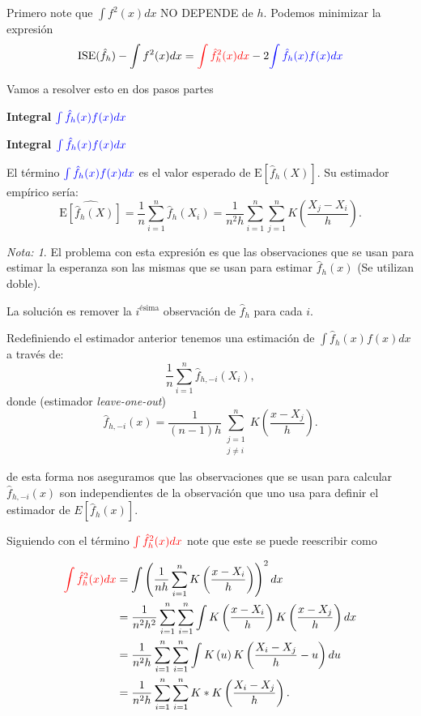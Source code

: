 \documentclass[
  12pt,
]{book}
\theoremstyle{definition}
\theoremstyle{definition}
\theoremstyle{definition}
\theoremstyle{definition}
\theoremstyle{remark}
\newtheorem*{remark}{Nota: }
\begin{document}
Primero note que \(\int f^{2}(x)dx\) NO DEPENDE de \(h\). Podemos minimizar
la expresión \begin{equation*}
\mathrm{ISE}(\hat{f}_{h})-\int f^{2}(x)dx=
\textcolor{red}{\int\hat{f}_{h}^{2}(x)dx}
-2
\textcolor{blue}{\int\hat{f}_{h}(x)f(x)dx}
\end{equation*}

Vamos a resolver esto en dos pasos partes

\textbf{Integral} \(\textcolor{blue}{\int\hat{f}_{h}(x)f(x)dx}\)

\textbf{Integral \(\textcolor{blue}{\int\hat{f}_{h}(x)f(x)dx}\)}

El término \(\textcolor{blue}{\int\hat{f}_{h}(x)f(x)dx}\) es el valor esperado de
\(\mathrm{E}\left[\hat{f}_h(X)\right]\). Su estimador empírico sería:
\begin{equation*}
\widehat{\mathrm{E}\left[\hat{f}_h(X)\right]}
= \frac{1}{n}\sum_{i=1}^{n}\hat{f}_{h}(X_{i})
=\frac{1}{n^{2}h}\sum_{i=1}^{n}\sum_{j=1}^{n}
K\left(\frac{X_{j}-X_{i}}{h}\right).
\end{equation*}

\begin{remark}
El problema con esta expresión es que las observaciones que se usan para estimar la esperanza son las mismas que se usan para estimar \(\hat{f}_{h}(x)\) (Se utilizan doble).
\end{remark}

La solución es remover la \(i^{\text{ésima}}\) observación de
\(\hat{f}_{h}\) para cada \(i\).

Redefiniendo el estimador anterior tenemos una estimación de \(\int \hat{f}_{h}(x)f(x)dx\) a través de:
\[
\frac{1}{n}\sum_{i=1}^{n}\hat{f}_{h,-i}(X_{i}),
\]
donde (estimador \emph{leave-one-out})
\[
\hat{f}_{h,-i}(x)=\frac{1}{(n-1)h}\sum_{\substack{j=1\\ j\neq i}}^{n}K\left( \frac{x-X_{j}}{h} \right) .
\]

de esta forma nos aseguramos que las observaciones que se usan para calcular \(\hat{f}_{h,-i}(x)\) son independientes de la observación que uno usa para definir el estimador de \(E[\hat f_h(x)]\).

Siguiendo con el término \(\textcolor{red}{\int\hat{f}_{h}^{2}(x)dx}\)
note que este se puede reescribir como

\begin{align*}
\textcolor{red}{\int\hat{f}_{h}^{2}(x)dx}
& =\int\left(\frac{1}{nh}\sum_{i=1}^{n}K\left( \frac{x-X_{i}}{h} \right)\right)^{2}dx                                    \\
& =\frac{1}{n^{2}h^{2}}\sum_{i=1}^{n}\sum_{i=1}^{n}\int K\left(\frac{x-X_{i}}{h}\right)K\left(\frac{x-X_{j}}{h}\right)dx \\
& =\frac{1}{n^{2}h}\sum_{i=1}^{n}\sum_{i=1}^{n}\int K\left(u\right)K\left(\frac{X_{i}-X_{j}}{h}-u\right)du               \\
& =\frac{1}{n^{2}h}\sum_{i=1}^{n}\sum_{i=1}^{n}K*K\left(\frac{X_{i}-X_{j}}{h}\right).
\end{align*}
\end{document}
